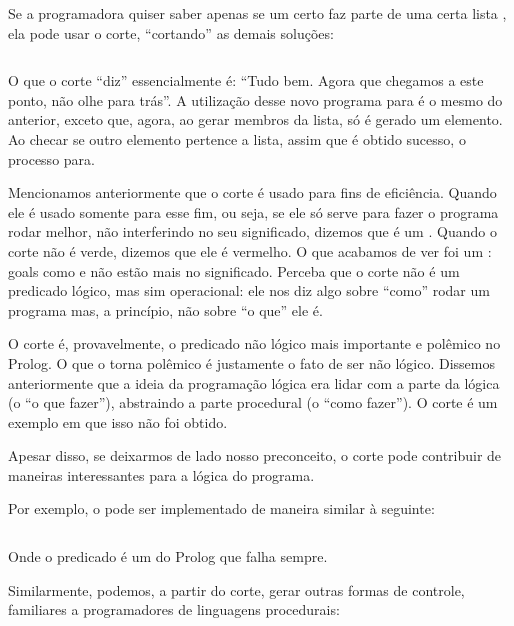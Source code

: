 Se a programadora quiser saber apenas se um certo  faz parte de uma certa lista , ela pode usar o corte, ``cortando'' as demais soluções:

    \begin{listing}
\inputminted{prolog}{../Exemplos/Cap4/prog2_member2.pl}
    \end{listing}

O que o corte ``diz'' essencialmente é: ``Tudo bem. Agora que chegamos a este ponto, não olhe para trás''. A utilização desse novo programa para  é o mesmo do anterior, exceto que, agora, ao gerar membros da lista, só é gerado um elemento. Ao checar se outro elemento pertence a lista, assim que é obtido sucesso, o processo para.

Mencionamos anteriormente que o corte é usado para fins de eficiência. Quando ele é usado somente para esse fim, ou seja, se ele só serve para fazer o programa rodar melhor, não interferindo no seu significado, dizemos que é um .
Quando o corte não é verde, dizemos que ele é vermelho. O que acabamos de ver foi um : goals como  e  não estão mais no significado. Perceba que o corte não é um predicado lógico, mas sim operacional: ele nos diz algo sobre ``como'' rodar um programa mas, a princípio, não sobre ``o que'' ele é.

O corte é, provavelmente, o predicado não lógico mais importante e polêmico no Prolog. O que o torna polêmico é justamente o fato de ser não lógico. Dissemos anteriormente que a ideia da programação lógica era lidar com a parte da lógica (o ``o que fazer''), abstraindo a parte procedural (o ``como fazer''). O corte é um exemplo em que isso não foi obtido.

Apesar disso, se deixarmos de lado nosso preconceito, o corte pode contribuir de maneiras interessantes para a lógica do programa.

Por exemplo, o  pode ser implementado de maneira similar à seguinte:

    \begin{listing}
\inputminted{prolog}{../Exemplos/Cap4/prog3_not.pl}
    \end{listing}

Onde o predicado  é um  do Prolog que falha sempre.

Similarmente, podemos, a partir do corte, gerar outras formas de controle, familiares a programadores de linguagens procedurais:


